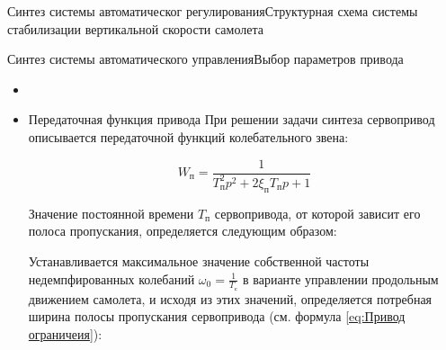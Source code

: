 \begin{frame}{Синтез системы автоматическог регулирования}{Структурная схема системы стабилизации вертикальной скорости самолета}
\end{frame}

\begin{frame}{Синтез системы автоматического управления}{Выбор параметров привода}
    \begin{itemize}
    \item <+-> []
    \item <+-> []   \begin{block}{Передаточная функция привода}
        При решении задачи синтеза сервопривод описывается передаточной функций колебательного звена:
    
    \begin{equation}
    \label{eq:Привод ограничеия}
        W_{\text{п}}=\frac{1}{T_\text{п}^2p^2+2\xi_\text{п}T_\text{п}p+1}
    \end{equation}
    
    Значение постоянной времени  $T_\text{п}$ сервопривода, от которой зависит его полоса пропускания, определяется следующим образом:
    
    Устанавливается максимальное значение собственной частоты  недемпфированных колебаний $\omega_0=\frac{1}{T_{\text{с}}}$ в варианте управлении продольным движением самолета, и исходя из этих значений, определяется потребная ширина полосы пропускания сервопривода (см. формула \ref{eq:Привод ограничеия}):
    \end{block}
\end{itemize}
\end{frame}

